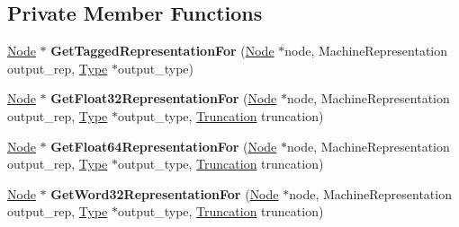 \subsection*{Private Member Functions}
\begin{DoxyCompactItemize}
\item 
\hyperlink{classv8_1_1internal_1_1compiler_1_1_node}{Node} $\ast$ {\bfseries Get\+Tagged\+Representation\+For} (\hyperlink{classv8_1_1internal_1_1compiler_1_1_node}{Node} $\ast$node, Machine\+Representation output\+\_\+rep, \hyperlink{classv8_1_1internal_1_1_type}{Type} $\ast$output\+\_\+type)\hypertarget{classv8_1_1internal_1_1compiler_1_1_representation_changer_a5b49f3640c3acc40afc822ee34434205}{}\label{classv8_1_1internal_1_1compiler_1_1_representation_changer_a5b49f3640c3acc40afc822ee34434205}

\item 
\hyperlink{classv8_1_1internal_1_1compiler_1_1_node}{Node} $\ast$ {\bfseries Get\+Float32\+Representation\+For} (\hyperlink{classv8_1_1internal_1_1compiler_1_1_node}{Node} $\ast$node, Machine\+Representation output\+\_\+rep, \hyperlink{classv8_1_1internal_1_1_type}{Type} $\ast$output\+\_\+type, \hyperlink{classv8_1_1internal_1_1compiler_1_1_truncation}{Truncation} truncation)\hypertarget{classv8_1_1internal_1_1compiler_1_1_representation_changer_aa0c0c08728654bb7d561c3f2143a9216}{}\label{classv8_1_1internal_1_1compiler_1_1_representation_changer_aa0c0c08728654bb7d561c3f2143a9216}

\item 
\hyperlink{classv8_1_1internal_1_1compiler_1_1_node}{Node} $\ast$ {\bfseries Get\+Float64\+Representation\+For} (\hyperlink{classv8_1_1internal_1_1compiler_1_1_node}{Node} $\ast$node, Machine\+Representation output\+\_\+rep, \hyperlink{classv8_1_1internal_1_1_type}{Type} $\ast$output\+\_\+type, \hyperlink{classv8_1_1internal_1_1compiler_1_1_truncation}{Truncation} truncation)\hypertarget{classv8_1_1internal_1_1compiler_1_1_representation_changer_aa935ae3d68a42ae28929d3aed01473c1}{}\label{classv8_1_1internal_1_1compiler_1_1_representation_changer_aa935ae3d68a42ae28929d3aed01473c1}

\item 
\hyperlink{classv8_1_1internal_1_1compiler_1_1_node}{Node} $\ast$ {\bfseries Get\+Word32\+Representation\+For} (\hyperlink{classv8_1_1internal_1_1compiler_1_1_node}{Node} $\ast$node, Machine\+Representation output\+\_\+rep, \hyperlink{classv8_1_1internal_1_1_type}{Type} $\ast$output\+\_\+type, \hyperlink{classv8_1_1internal_1_1compiler_1_1_truncation}{Truncation} truncation)\hypertarget{classv8_1_1internal_1_1compiler_1_1_representation_changer_ab80ed12b6b10ce33c7c6c0c6fdc60e94}{}\label{classv8_1_1internal_1_1compiler_1_1_representation_changer_ab80ed12b6b10ce33c7c6c0c6fdc60e94}


\end{DoxyCompactItemize}
